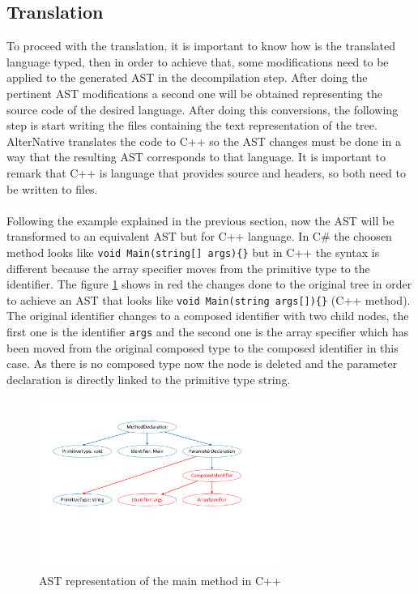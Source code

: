 \subsection{Translation}\label{SS:AN-Process-Translation}
To proceed with the translation, it is important to know how is the translated language typed, then in order to achieve that, some modifications need to be applied to the generated AST in the decompilation step. After doing the pertinent AST modifications a second one will be obtained representing the source code of the desired language. After doing this conversions, the following step is start writing the files containing the text representation of the tree. AlterNative translates the code to C++ so the AST changes must be done in a way that the resulting AST corresponds to that language. It is important to remark that C++ is language that provides source and headers, so both need to be written to files.
\\
\\
Following the example explained in the previous section, now the AST will be transformed to an equivalent AST but for C++ language. In C\# the choosen method looks like \verb!void Main(string[] args){}! but in C++ the syntax is different because the array specifier moves from the primitive type to the identifier. The figure \ref{fig:AN-AST-Conversions} shows in red the changes done to the original tree in order to achieve an AST that looks like \verb!void Main(string args[]){}! (C++ method). The original identifier changes to a composed identifier with two child nodes, the first one is the identifier \verb!args! and the second one is the array specifier which has been moved from the original composed type to the composed identifier in this case. As there is no composed type now the node is deleted and the parameter declaration is directly linked to the primitive type string.
\begin{figure}[H]\begin{center}
 \centering
  \captionsetup{justification=centering}
  \includegraphics[width=0.7\textwidth]{pictures/alternative/ast_conversions_cpp}
  \caption{AST representation of the main method in C++\label{fig:AN-AST-Conversions}}
\end{center}\end{figure}

